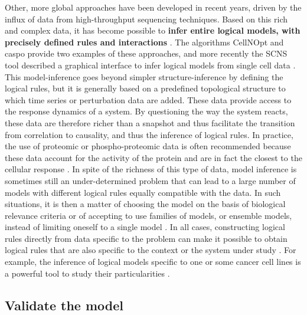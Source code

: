 \documentclass[a4paper,12pt,twoside,onecolumn,openright,final,oldfontcommands]{memoir}
\begin{document}
Other, more global approaches have been developed in recent years,
driven by the influx of data from high-throughput sequencing techniques.
Based on this rich and complex data, it has become possible to
\textbf{infer entire logical models, with precisely defined rules and
interactions} \citep{ostrowski2016boolean}. The algorithms CellNOpt
\citep{terfve2012cellnoptr} and caspo \citep{videla2017caspo} provide
two examples of these approaches, and more recently the SCNS tool
described a graphical interface to infer logical models from single cell
data \citep{woodhouse2018scns}. This model-inference goes beyond simpler
structure-inference by defining the logical rules, but it is generally
based on a predefined topological structure to which time series or
perturbation data are added. These data provide access to the response
dynamics of a system. By questioning the way the system reacts, these
data are therefore richer than a snapshot and thus facilitate the
transition from correlation to causality, and thus the inference of
logical rules. In practice, the use of proteomic or phospho-proteomic
data is often recommended because these data account for the activity of
the protein and are in fact the closest to the cellular response
\citep{ostrowski2016boolean, terfve2012cellnoptr, terfve2015largescale}.
In spite of the richness of this type of data, model inference is
sometimes still an under-determined problem that can lead to a large
number of models with different logical rules equally compatible with
the data. In such situations, it is then a matter of choosing the model
on the basis of biological relevance criteria or of accepting to use
families of models, or ensemble models, instead of limiting oneself to a
single model \citep{videla2017caspo}. In all cases, constructing logical
rules directly from data specific to the problem can make it possible to
obtain logical rules that are also specific to the context or the system
under study \citep{saezrodriguez2011comparing}. For example, the
inference of logical models specific to one or some cancer cell lines is
a powerful tool to study their particularities
\citep{razzaq2018computational}.

\subsection{Validate the model}\label{validate-the-model}
\end{document}
